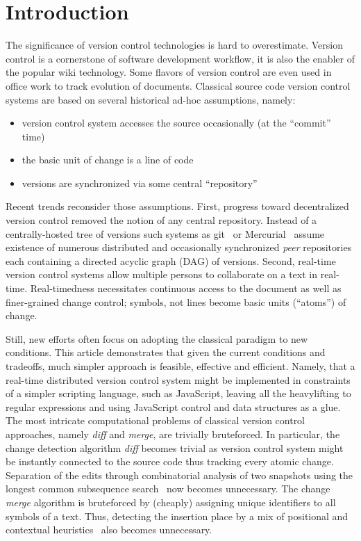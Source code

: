 \documentclass[twocolumn]{article}
\begin{document}
\section{Introduction}

The significance of version control technologies is hard to overestimate.
Version control is a cornerstone of software development workflow, it is also the enabler of the popular wiki technology. Some flavors of version control are even used in office work to track evolution of documents.
Classical source code version control systems are based on several historical ad-hoc assumptions, namely:
\begin{itemize}
\item version control system accesses the source occasionally (at the ``commit'' time)
\item the basic unit of change is a line of code
\item versions are synchronized via some central ``repository''
\end{itemize}
Recent trends reconsider those assumptions.
First, progress toward decentralized version control removed the notion of any central repository. Instead of a centrally-hosted tree of versions such systems as git~\cite{git} or Mercurial~\cite{mercurial} assume existence of numerous distributed and occasionally synchronized \emph{peer} repositories each containing a directed acyclic graph (DAG) of versions.
Second, real-time version control systems allow multiple persons to collaborate on a text in real-time. Real-timedness necessitates continuous access to the document as well as finer-grained change control;  symbols, not lines become basic units (``atoms'') of change.

Still, new efforts often focus on adopting the classical paradigm to new conditions. This article demonstrates that given the current conditions and tradeoffs, much simpler approach is feasible, effective and efficient.
Namely, that a real-time distributed version control system might be implemented in constraints of a simpler scripting language, such as JavaScript, leaving all the heavylifting to regular expressions and using JavaScript control and data structures as a glue.
The most intricate computational problems of classical version control  approaches, namely \emph{diff} and \emph{merge}, are trivially bruteforced. In particular, the change detection algorithm \emph{diff} becomes trivial as version control system might be instantly connected to the source code thus tracking every atomic change. Separation of the edits through combinatorial analysis of two snapshots using the longest common subsequence search~\cite{diff} now becomes unnecessary. The change \emph{merge} algorithm is bruteforced by (cheaply) assigning unique identifiers to all symbols of a text. Thus, detecting the insertion place by a mix of positional and contextual heuristics~\cite{fraser} also becomes unnecessary.
\end{document}
